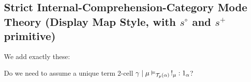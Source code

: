 \documentclass[10pt]{article}
\let\emptyset\varnothing
\newcommand{\yields}{\vdash}
\newcommand{\type}{\,\,\mathsf{mtype}}
\newcommand\TermTwoT[5]{\ensuremath{#1 \mid #3 \vDash_{#5} #2 : #4}}
\newcommand\TrPlus[2]{\ensuremath{#1^+(#2)}}
\newcommand{\id}{\mathsf{id}}
\begin{document}



\subsection{Strict Internal-Comprehension-Category Mode Theory (Display Map Style, with $s^\circ$ and $s^+$ primitive)}

We add exactly these:

Do we need to assume a unique term 2-cell $\TermTwoT{\gamma}{\,!_\mu}{\mu}{1_\alpha}{\El{p}{\alpha}}$?
\end{document}
